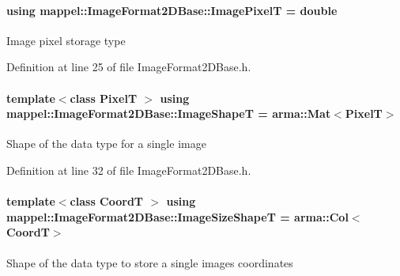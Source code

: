\paragraph[{\texorpdfstring{Image\+PixelT}{ImagePixelT}}]{\setlength{\rightskip}{0pt plus 5cm}using {\bf mappel\+::\+Image\+Format2\+D\+Base\+::\+Image\+PixelT} =  double\hspace{0.3cm}{\ttfamily [inherited]}}\hypertarget{classmappel_1_1ImageFormat2DBase_af6bae6f78398ab1eacb39726a05adeef}{}\label{classmappel_1_1ImageFormat2DBase_af6bae6f78398ab1eacb39726a05adeef}
Image pixel storage type 

Definition at line 25 of file Image\+Format2\+D\+Base.\+h.

\paragraph[{\texorpdfstring{Image\+ShapeT}{ImageShapeT}}]{\setlength{\rightskip}{0pt plus 5cm}template$<$class PixelT $>$ using {\bf mappel\+::\+Image\+Format2\+D\+Base\+::\+Image\+ShapeT} =  arma\+::\+Mat$<$PixelT$>$\hspace{0.3cm}{\ttfamily [inherited]}}\hypertarget{classmappel_1_1ImageFormat2DBase_ac40fc3773b5668601c63905876cca732}{}\label{classmappel_1_1ImageFormat2DBase_ac40fc3773b5668601c63905876cca732}
Shape of the data type for a single image 

Definition at line 32 of file Image\+Format2\+D\+Base.\+h.

\paragraph[{\texorpdfstring{Image\+Size\+ShapeT}{ImageSizeShapeT}}]{\setlength{\rightskip}{0pt plus 5cm}template$<$class CoordT $>$ using {\bf mappel\+::\+Image\+Format2\+D\+Base\+::\+Image\+Size\+ShapeT} =  arma\+::\+Col$<$CoordT$>$\hspace{0.3cm}{\ttfamily [inherited]}}\hypertarget{classmappel_1_1ImageFormat2DBase_a23c1a9e9f1482852aa0cf4951efe7c48}{}\label{classmappel_1_1ImageFormat2DBase_a23c1a9e9f1482852aa0cf4951efe7c48}
Shape of the data type to store a single image\textquotesingle{}s coordinates 

